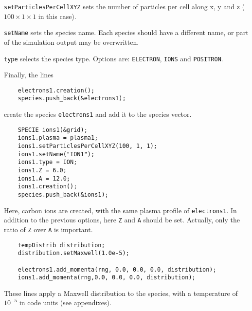 \documentclass[11pt,a4paper]{report}
\begin{document}
\verb+setParticlesPerCellXYZ+ sets the number of particles per cell along x, y and z ($100 \times 1 \times 1$ in this case).

\verb+setName+ sets the species name. Each species should have a different name, or part of the simulation output may be overwritten.

\verb+type+ selects the species type. Options are: \verb+ELECTRON+, \verb+IONS+ and \verb+POSITRON+.

Finally, the lines
\begin{lstlisting}
	electrons1.creation();
	species.push_back(&electrons1);
\end{lstlisting}
create the species \verb+electrons1+ and add it to the species vector.
\begin{lstlisting}
	SPECIE ions1(&grid);
	ions1.plasma = plasma1;
	ions1.setParticlesPerCellXYZ(100, 1, 1);
	ions1.setName("ION1");
	ions1.type = ION;
	ions1.Z = 6.0;
	ions1.A = 12.0;
	ions1.creation();
	species.push_back(&ions1);
\end{lstlisting}
Here, carbon ions are created, with the same plasma profile of \verb+electrons1+. In addition to the previous options, here \verb+Z+ and \verb+A+ should be set. Actually, only the ratio of \verb+Z+ over \verb+A+ is important.
\begin{lstlisting}
	tempDistrib distribution;
	distribution.setMaxwell(1.0e-5);

	electrons1.add_momenta(rng, 0.0, 0.0, 0.0, distribution);
	ions1.add_momenta(rng,0.0, 0.0, 0.0, distribution);
\end{lstlisting}
These lines apply a Maxwell distribution to the species, with a temperature of $10^{-5}$ in code units (see appendixes).
\end{document}
